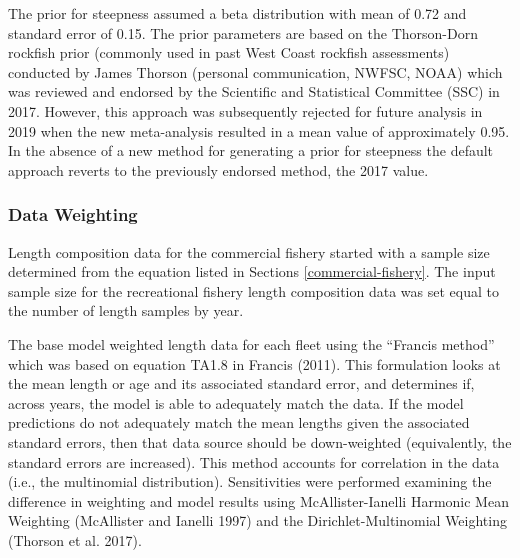 \documentclass[11pt,
  english,
  a4paper,
]{article}
\begin{document}
The prior for steepness assumed a beta distribution with mean of 0.72 and standard error of 0.15. The prior parameters are based on the Thorson-Dorn rockfish prior (commonly used in past West Coast rockfish assessments) conducted by James Thorson (personal communication, NWFSC, NOAA) which was reviewed and endorsed by the Scientific and Statistical Committee (SSC) in 2017. However, this approach was subsequently rejected for future analysis in 2019 when the new meta-analysis resulted in a mean value of approximately 0.95. In the absence of a new method for generating a prior for steepness the default approach reverts to the previously endorsed method, the 2017 value.

\leavevmode\tagmcend\tagstructend\par


\hypertarget{data-weighting}{%
\subsubsection{Data Weighting}\label{data-weighting}}

\leavevmode\tagmcend\tagstructend


Length composition data for the commercial fishery started with a sample size determined from the equation listed in Sections \ref{commercial-fishery}. The input sample size for the recreational fishery length composition data was set equal to the number of length samples by year.

\leavevmode\tagmcend\tagstructend\par


The base model weighted length data for each fleet using the ``Francis method'' which was based on equation TA1.8 in Francis {(2011)\leavevmode\tagmcend\tagstructend}. This formulation looks at the mean length or age and its associated standard error, and determines if, across years, the model is able to adequately match the data. If the model predictions do not adequately match the mean lengths given the associated standard errors, then that data source should be down-weighted (equivalently, the standard errors are increased). This method accounts for correlation in the data (i.e., the multinomial distribution). Sensitivities were performed examining the difference in weighting and model results using McAllister-Ianelli Harmonic Mean Weighting {(McAllister and Ianelli 1997)\leavevmode\tagmcend\tagstructend} and the Dirichlet-Multinomial Weighting {(Thorson et al. 2017)\leavevmode\tagmcend\tagstructend}.
\end{document}
